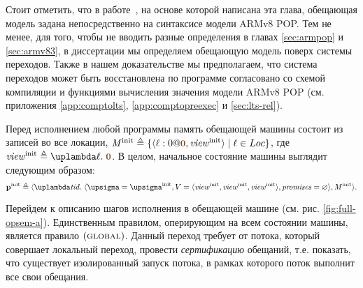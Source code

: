 Стоит отметить, что в работе~\cite{Podkopaev-al:ECOOP17}, на основе которой написана эта глава,
обещающая модель задана непосредственно на синтаксисе модели ARMv8 POP.
Тем не менее, для того, чтобы не вводить разные определения в главах \ref{sec:armpop} и
\ref{sec:armv83}, в диссертации мы определяем обещающую модель поверх системы переходов.
Также в нашем доказательстве мы предполагаем, что система переходов может быть восстановлена
по программе согласовано со схемой компиляции и функциями вычисления значения модели ARMv8 POP
(см. приложения \ref{app:comptolts}, \ref{app:comptopreexec} и \ref{sec:lts-rel}).

Перед исполнением любой программы память обещающей машины состоит из записей во все локации,
$\Mprom^{\rm init} \triangleq \{ \writeEvt{\loc}{0}{\tstamp{0}}{\R^{\rm init}} \mid \loc \in \Loc \}$,
где $\R^{\rm init} \triangleq \lambda \loc. \; \tstamp{0}$. В целом, начальное состояние машины выглядит следующим образом:
\[
  \pinit \triangleq \angled{
     \lambda \tId. \; \angled{\pstate = \pstate^{\rm init},
                              \V = \angled{\R^{\rm init}, \R^{\rm init}, \R^{\rm init}}, \PromSet = \emptyset},
     \Mprom^{\rm init}}.
\]

Перейдем к описанию шагов исполнения в обещающей машине (см. рис. \ref{fig:full-opsem-a}).
Единственным правилом, оперирующим на всем состоянии машины, является правило $(\textsc{global})$.
Данный переход требует от потока,
который совершает локальный переход, провести \emph{сертификацию} обещаний, т.е. показать,
что существует изолированный запуск потока, в рамках которого поток выполнит все свои обещания.


